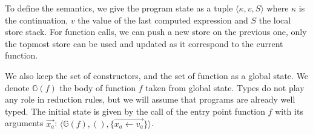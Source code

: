 \documentclass[a4paper,11pt]{article}
\newcommand\rtstate[3]{\langle #1, #2, #3\rangle}
\begin{document}
To define the semantics, we give the program state as a tuple $\rtstate{\kappa}{v}{S}$ where $\kappa$ is the continuation, $v$ the value of the last computed expression and $S$ the local store stack. For function calls, we can push a new store on the previous one, only the topmost store can be used and updated as it correspond to the current function.

We also keep the set of constructors, and the set of function as a global state. We denote $\mathbb{G}(f)$ the body of function $f$ taken from global state. Types do not play any role in reduction rules, but we will assume that programs are already well typed. The initial state is given by the call of the entry point function $f$ with its arguments $\overrightarrow{x_a}$: $\rtstate{\mathbb{G}(f)}{()}{\{\overrightarrow{x_a \leftarrow v_a}\}}$.
\end{document}
